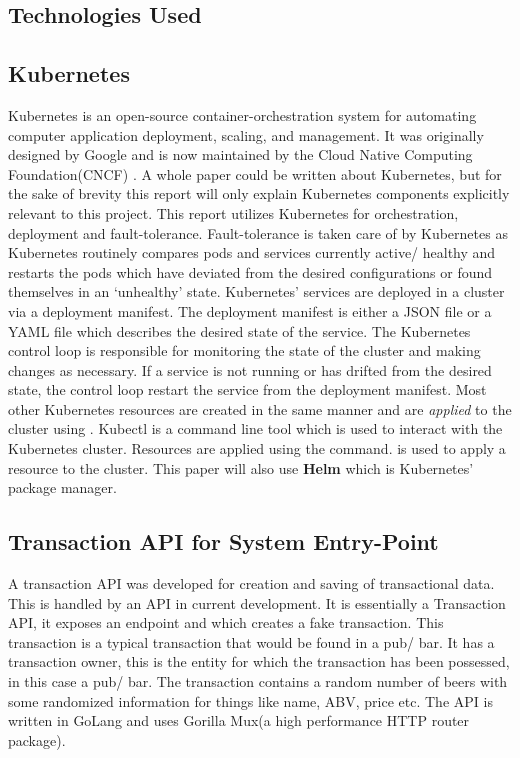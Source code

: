 \begin{flushleft}
	\section{Technologies Used}
	\subsection{Kubernetes}
	Kubernetes is an open-source container-orchestration system for automating computer application deployment, scaling, and management. It was originally designed
	by Google and is now maintained by the Cloud Native Computing Foundation(CNCF) \autocite{ProductionGradeContainerOrchestration}. A whole paper could be written about Kubernetes,
	but for the sake of brevity this report will only explain Kubernetes components explicitly relevant to this project. This report utilizes Kubernetes for orchestration,
	deployment and fault-tolerance.
	\newline Fault-tolerance is taken care of by Kubernetes as Kubernetes routinely compares pods and services currently active/ healthy and restarts the pods
	which have deviated from the desired configurations or found themselves in an `unhealthy' state.\newline
	Kubernetes' services are deployed in a cluster via a deployment manifest. The deployment manifest is either a JSON file or a YAML file which describes the desired state
	of the service. The Kubernetes control loop is responsible for monitoring the state of the cluster and making changes as necessary. If a service is not running or has drifted
	from the desired state, the control loop restart the service from the deployment manifest.
	\bigbreak
	Most other Kubernetes resources are created in the same manner and are \emph{applied} to the cluster using . Kubectl is a command line tool which is used to
	interact with the Kubernetes cluster. Resources are applied using the  command.  is used to apply a resource to the cluster. \newline
	This paper will also use \textbf{Helm} which is Kubernetes' package manager\autocite{UsingHelm}.
	\subsection{Transaction API for System Entry-Point}
	A transaction API was developed for creation and saving of transactional data.
	This is handled by an API in current development. It is essentially a Transaction API, it exposes an endpoint and which creates a fake transaction. This
	transaction is a typical transaction that would be found in a pub/ bar. It has a transaction owner, this is the entity for which the transaction has been
	possessed, in this case a pub/ bar. The transaction contains a random number of beers with some randomized information for things like name, ABV,
	price etc. The API is written in GoLang and uses Gorilla Mux(a high performance HTTP router package).

\end{flushleft}
